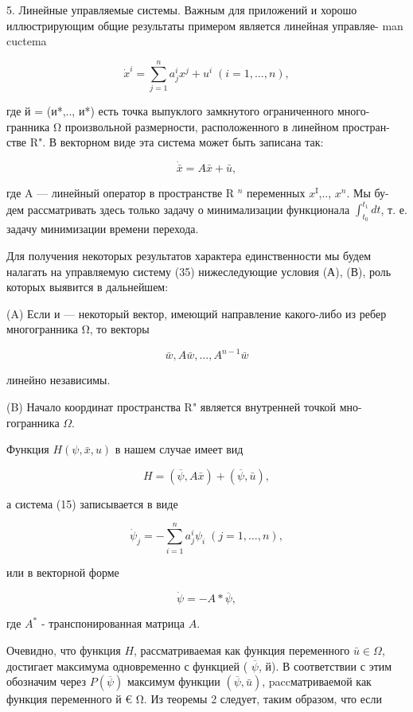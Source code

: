 \documentclass[10pt]{article}
\begin{document}
5. Линейные управляемые системы. Важным для приложений и хорошо иллюстрирующим общие результаты примером является линейная управляе- man cuctema

\[
{\dot{x}}^{i} = \mathop{\sum }\limits_{{j = 1}}^{n}{a}_{j}^{i}{x}^{j} + {u}^{i}\;\left( {i = 1,\ldots,n}\right),
\]

где й = (и*,.., и*) есть точка выпуклого замкнутого ограниченного много- гранника Ω произвольной размерности, расположенного в линейном простран- стве R". В векторном виде эта система может быть записана так:

\[
\dot{\bar{x}} = A\bar{x} + \bar{u}, \tag{35}
\]

где A — линейный оператор в пространстве R \({}^{n}\) переменных \({x}^{\mathrm{I}}\),.., \({x}^{n}\). Мы бу- дем рассматривать здесь только задачу о минимализации функционала \({\int }_{{t}_{0}}^{{t}_{1}}{dt}\), т. е. задачу минимизации времени перехода.

Для получения некоторых результатов характера единственности мы будем налагать на управляемую систему (35) нижеследующие условия (А), (В), роль которых выявится в дальнейшем:

(A) Если и — некоторый вектор, имеющий направление какого-либо из ребер многогранника Ω, то векторы

\[
\bar{w},A\bar{w},\ldots,{A}^{n - 1}\bar{w} \tag{36}
\]

линейно независимы.

(B) Начало координат пространства R" является внутренней точкой мно- гогранника \(\Omega\).

Функция \(H\left( {\psi,\bar{x},u}\right)\) в нашем случае имеет вид

\[
H = \left( {\overline{\psi },A\bar{x}}\right)  + \left( {\overline{\psi },\bar{u}}\right), \tag{37}
\]

а система (15) записывается в виде

\[
{\dot{\psi }}_{j} =  - \mathop{\sum }\limits_{{i = 1}}^{n}{a}_{j}^{i}{\psi }_{i}\;\left( {j = 1,\ldots,n}\right),
\]

или в векторной форме

\[
\dot{\psi } =  - A * \overline{\psi }, \tag{38}
\]

где \({A}^{ * }\) - транспонированная матрица \(A\).

Очевидно, что функция \(H\), рассматриваемая как функция переменного \(\bar{u} \in  \Omega\), достигает максимума одновременно с функцией ( \(\overline{\psi }\), й). В соответствии с этим обозначим через \(P\left( \overline{\psi }\right)\) максимум функции \(\left( {\overline{\psi },\bar{u}}\right)\), paccматриваемой как функция переменного й € Ω. Из теоремы 2 следует, таким образом, что если
\end{document}
